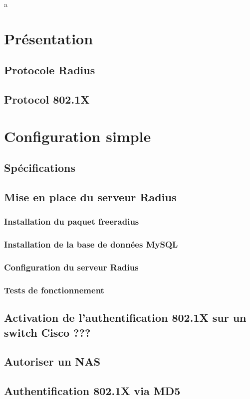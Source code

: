a\newcommand{\titreA}{Rapport}
\newcommand{\titreB}{Documentation}


\section{Présentation}
	\subsection{Protocole Radius}
	\subsection{Protocol 802.1X}

\section{Configuration simple}
	\subsection{Spécifications}
	\subsection{Mise en place du serveur Radius}
		\subsubsection{Installation du paquet freeradius}
		\subsubsection{Installation de la base de données MySQL}
		\subsubsection{Configuration du serveur Radius}
		\subsubsection{Tests de fonctionnement}
	\subsection{Activation de l'authentification 802.1X sur un switch Cisco ???}
	\subsection{Autoriser un NAS}
	\subsection{Authentification 802.1X via MD5}
